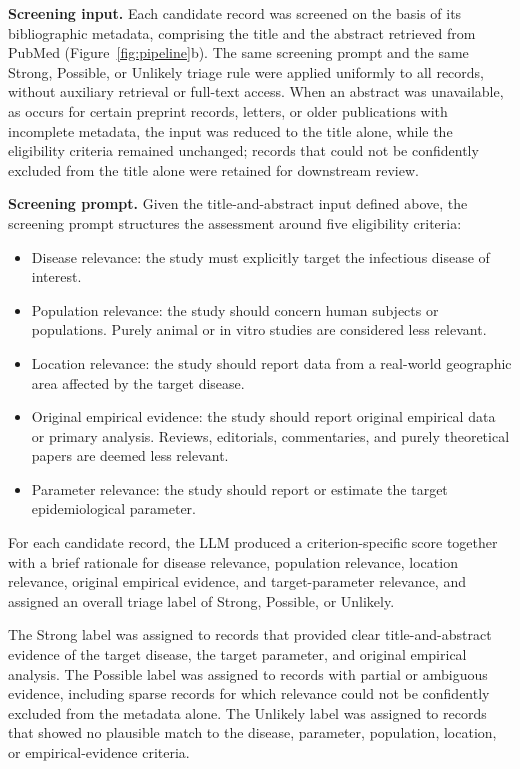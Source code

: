 \textbf{Screening input.}
Each candidate record was screened on the basis of its bibliographic metadata, comprising the title and the abstract retrieved from PubMed (Figure~\ref{fig:pipeline}b). The same screening prompt and the same Strong, Possible, or Unlikely triage rule were applied uniformly to all records, without auxiliary retrieval or full-text access. When an abstract was unavailable, as occurs for certain preprint records, letters, or older publications with incomplete metadata, the input was reduced to the title alone, while the eligibility criteria remained unchanged; records that could not be confidently excluded from the title alone were retained for downstream review.

\textbf{Screening prompt.}
Given the title-and-abstract input defined above, the screening prompt structures the assessment around five eligibility criteria:

\begin{itemize}
  \item Disease relevance: the study must explicitly target the infectious disease of interest.
  \item Population relevance: the study should concern human subjects or populations. Purely animal or in vitro studies are considered less relevant.
  \item Location relevance: the study should report data from a real-world geographic area affected by the target disease.
  \item Original empirical evidence: the study should report original empirical data or primary analysis. Reviews, editorials, commentaries, and purely theoretical papers are deemed less relevant.
  \item Parameter relevance: the study should report or estimate the target epidemiological parameter.
\end{itemize}

For each candidate record, the LLM produced a criterion-specific score together with a brief rationale for disease relevance, population relevance, location relevance, original empirical evidence, and target-parameter relevance, and assigned an overall triage label of Strong, Possible, or Unlikely.

The Strong label was assigned to records that provided clear title-and-abstract evidence of the target disease, the target parameter, and original empirical analysis. The Possible label was assigned to records with partial or ambiguous evidence, including sparse records for which relevance could not be confidently excluded from the metadata alone. The Unlikely label was assigned to records that showed no plausible match to the disease, parameter, population, location, or empirical-evidence criteria.

